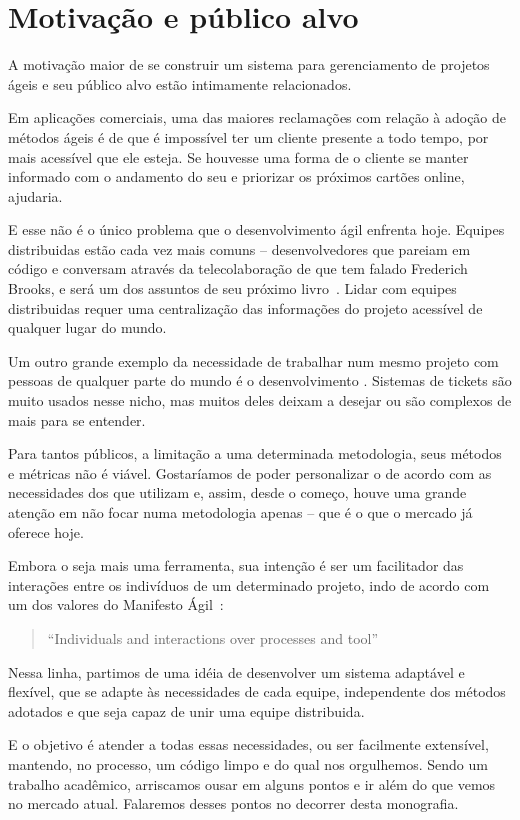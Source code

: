 \section{Motivação e público alvo}

A motivação maior de se construir um sistema para gerenciamento de projetos ágeis e seu público alvo estão intimamente relacionados. 

Em aplicações comerciais, uma das maiores reclamações com relação à adoção de métodos ágeis é de que é impossível ter um cliente presente a todo tempo, por mais acessível que ele esteja. Se houvesse uma forma de o cliente se manter informado com o andamento do seu \software e priorizar os próximos cartões online, ajudaria.

E esse não é o único problema que o desenvolvimento ágil enfrenta hoje. Equipes distribuidas estão cada vez mais comuns -- desenvolvedores que pareiam em código e conversam através da telecolaboração de que tem falado Frederich Brooks, e será um dos assuntos de seu próximo livro~\cite{brooks}. Lidar com equipes distribuidas requer uma centralização das informações do projeto acessível de qualquer lugar do mundo.

Um outro grande exemplo da necessidade de trabalhar num mesmo projeto com pessoas de qualquer parte do mundo é o desenvolvimento \opensource. Sistemas de tickets são muito usados nesse nicho, mas muitos deles deixam a desejar ou são complexos de mais para se entender.

Para tantos públicos, a limitação a uma determinada metodologia, seus métodos e métricas não é viável. Gostaríamos de poder personalizar o \calopsita de acordo com as necessidades dos que utilizam e, assim, desde o começo, houve uma grande atenção em não focar numa metodologia apenas -- que é o que o mercado já oferece hoje.

Embora o \calopsita seja mais uma ferramenta, sua intenção é ser um facilitador das interações entre os indivíduos de um determinado projeto, indo de acordo com um dos valores do Manifesto Ágil~\cite{manifesto}:

\begin{quote}
``Individuals and interactions over processes and tool''
\end{quote}

Nessa linha, partimos de uma idéia de desenvolver um sistema adaptável e flexível, que se adapte às necessidades de cada equipe, independente dos métodos adotados e que seja capaz de unir uma equipe distribuida.

E o objetivo é atender a todas essas necessidades, ou ser facilmente extensível, mantendo, no processo, um código limpo e do qual nos orgulhemos. Sendo um trabalho acadêmico, arriscamos ousar em alguns pontos e ir além do que vemos no mercado atual. Falaremos desses pontos no decorrer desta monografia.
